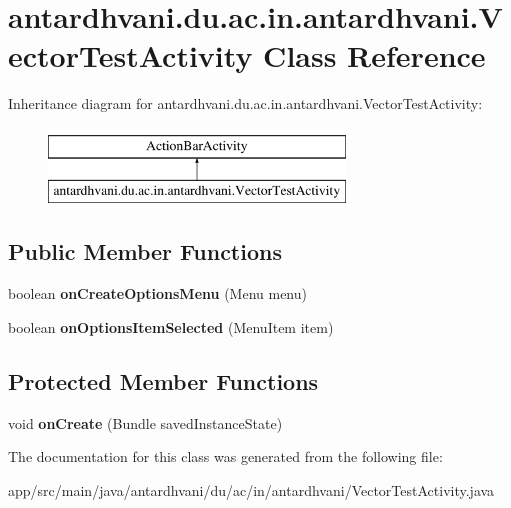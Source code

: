 \hypertarget{classantardhvani_1_1du_1_1ac_1_1in_1_1antardhvani_1_1_vector_test_activity}{}\section{antardhvani.\+du.\+ac.\+in.\+antardhvani.\+Vector\+Test\+Activity Class Reference}
\label{classantardhvani_1_1du_1_1ac_1_1in_1_1antardhvani_1_1_vector_test_activity}
Inheritance diagram for antardhvani.\+du.\+ac.\+in.\+antardhvani.\+Vector\+Test\+Activity\+:\begin{figure}[H]
\begin{center}
\leavevmode
\includegraphics[height=2.000000cm]{classantardhvani_1_1du_1_1ac_1_1in_1_1antardhvani_1_1_vector_test_activity}
\end{center}
\end{figure}
\subsection*{Public Member Functions}
\begin{DoxyCompactItemize}
\item 
\hypertarget{classantardhvani_1_1du_1_1ac_1_1in_1_1antardhvani_1_1_vector_test_activity_a539b1d36ffa9345e9584b2f2f2ed5ff0}{}boolean {\bfseries on\+Create\+Options\+Menu} (Menu menu)\label{classantardhvani_1_1du_1_1ac_1_1in_1_1antardhvani_1_1_vector_test_activity_a539b1d36ffa9345e9584b2f2f2ed5ff0}

\item 
\hypertarget{classantardhvani_1_1du_1_1ac_1_1in_1_1antardhvani_1_1_vector_test_activity_ae36a225f368b12e8447b694cb5dd7e83}{}boolean {\bfseries on\+Options\+Item\+Selected} (Menu\+Item item)\label{classantardhvani_1_1du_1_1ac_1_1in_1_1antardhvani_1_1_vector_test_activity_ae36a225f368b12e8447b694cb5dd7e83}

\end{DoxyCompactItemize}
\subsection*{Protected Member Functions}
\begin{DoxyCompactItemize}
\item 
\hypertarget{classantardhvani_1_1du_1_1ac_1_1in_1_1antardhvani_1_1_vector_test_activity_aacfd831a19452f8de1680e464855dba5}{}void {\bfseries on\+Create} (Bundle saved\+Instance\+State)\label{classantardhvani_1_1du_1_1ac_1_1in_1_1antardhvani_1_1_vector_test_activity_aacfd831a19452f8de1680e464855dba5}

\end{DoxyCompactItemize}


The documentation for this class was generated from the following file\+:\begin{DoxyCompactItemize}
\item 
app/src/main/java/antardhvani/du/ac/in/antardhvani/Vector\+Test\+Activity.\+java\end{DoxyCompactItemize}
